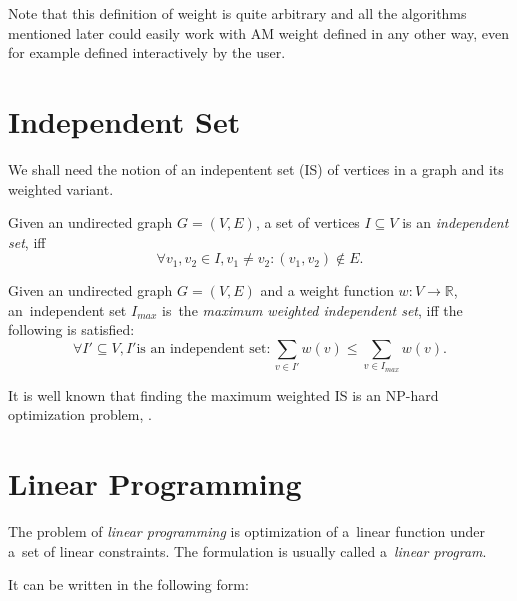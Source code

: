 Note that this definition of weight is quite arbitrary and all the algorithms mentioned later could easily work with AM weight defined in any other way, even for example defined interactively by the user.

\section{Independent Set}
\label{section-definitions-is}


We shall need the notion of an indepentent set (IS) of vertices in a graph and its weighted variant.

\begin{define}
Given an undirected graph $G = (V, E)$, a set of vertices $I \subseteq V$ is an \textit{independent set}, iff
\[\forall v_1, v_2 \in I, v_1 \neq v_2: (v_1, v_2) \notin E.\]
\end{define}

\begin{define}
Given an undirected graph $G = (V, E)$ and a weight function $w: V \rightarrow \mathbb{R}$, an~independent set $I_{max}$ is~the \textit{maximum weighted independent set}, iff the following is satisfied:
\[\forall I' \subseteq V, I' \text{is an independent set}: \sum_{v \in I'} w(v) \leqslant \sum_{v \in I_{max}} w(v).\]
\end{define}

It is well known that finding the maximum weighted IS is an NP-hard optimization problem, \cite{JM1986425}.

\section{Linear Programming}

The problem of \textit{linear programming} is optimization of a~linear function under a~set of linear constraints. The formulation is usually called a~\textit{linear program}. 

It can be written in the following form:

